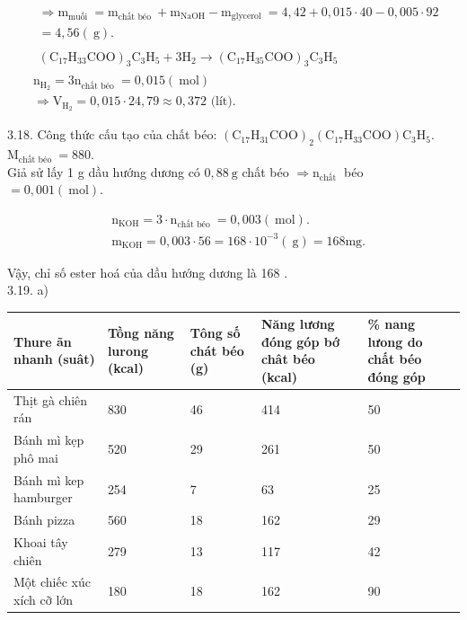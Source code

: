 \documentclass[10pt]{article}
\begin{document}
$$
\begin{aligned}
& \begin{array}{l}
\Rightarrow \mathrm{m}_{\text {muối }}=\mathrm{m}_{\text {chất béo }}+\mathrm{m}_{\mathrm{NaOH}}-\mathrm{m}_{\text {glycerol }}=4,42+0,015 \cdot 40-0,005 \cdot 92 \\
=4,56(\mathrm{~g}) .
\end{array} \\
& \begin{aligned}
\left(\mathrm{C}_{17} \mathrm{H}_{33} \mathrm{COO}\right)_{3} \mathrm{C}_{3} \mathrm{H}_{5}+3 \mathrm{H}_{2} \longrightarrow\left(\mathrm{C}_{17} \mathrm{H}_{35} \mathrm{COO}\right)_{3} \mathrm{C}_{3} \mathrm{H}_{5}
\end{aligned} \\
& \mathrm{n}_{\mathrm{H}_{2}}=3 \mathrm{n}_{\text {chất béo }}=0,015(\mathrm{~mol}) \\
& \Rightarrow \mathrm{V}_{\mathrm{H}_{2}}=0,015 \cdot 24,79 \approx 0,372 \text { (lít). }
\end{aligned}
$$

3.18. Công thức cấu tạo của chất béo: $\left(\mathrm{C}_{17} \mathrm{H}_{31} \mathrm{COO}\right)_{2}\left(\mathrm{C}_{17} \mathrm{H}_{33} \mathrm{COO}\right) \mathrm{C}_{3} \mathrm{H}_{5}$.\\
$\mathrm{M}_{\text {chất béo }}=880$.\\
Giả sử lấy 1 g dầu hướng dương có $0,88 \mathrm{~g}$ chất béo $\Rightarrow \mathrm{n}_{\text {chất }}$ béo $=0,001(\mathrm{~mol})$.

$$
\begin{aligned}
& \mathrm{n}_{\mathrm{KOH}}=3 \cdot \mathrm{n}_{\text {chất béo }}=0,003(\mathrm{~mol}) . \\
& \mathrm{m}_{\mathrm{KOH}}=0,003 \cdot 56=168 \cdot 10^{-3}(\mathrm{~g})=168 \mathrm{mg} .
\end{aligned}
$$

Vậy, chỉ số ester hoá của dầu hướng dương là 168 .\\
3.19. a)

\begin{center}
\begin{tabular}{|l|l|l|l|l|}
\hline
Thure ãn nhanh (suât) & Tồng năng lurong (kcal) & Tông số chát béo (g) & Năng lương đóng góp bớ chât béo (kcal) & \% nang lưong do chất béo đóng góp \\
\hline
Thịt gà chiên rán & 830 & 46 & 414 & 50 \\
\hline
Bánh mì kẹp phô mai & 520 & 29 & 261 & 50 \\
\hline
Bánh mì kep hamburger & 254 & 7 & 63 & 25 \\
\hline
Bánh pizza & 560 & 18 & 162 & 29 \\
\hline
Khoai tây chiên & 279 & 13 & 117 & 42 \\
\hline
Một chiếc xúc xích cỡ lớn & 180 & 18 & 162 & 90 \\
\hline
\end{tabular}
\end{center}
\end{document}
